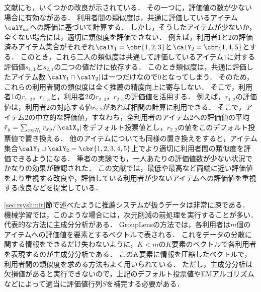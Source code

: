 文献\cite{uai:98:01}にも，いくつかの改良が示されている．
その一つに，評価値の数が少ない場合に有効ながある．
利用者間の類似度は，共通に評価しているアイテム$\calY_{ax}$への評価に基づいて計算する．
しかし，そうしたアイテムが少ないか，全くない場合には，適切に類似度を評価できない．
例えば，利用者1と2の評価済みアイテム集合がそれぞれ$\calY_1=\cbr{1,2,3}$と$\calY_2=\cbr{1,4,5}$とする．
このとき，これら二人の類似度は共通して評価しているアイテム$1$に対する評価値$s_{1,1}$と$s_{2,1}$の二つの値だけに依存する．
このとき類似度は，共通に評価したアイテム数$|\calY_1\cap \calY_2|$は一つだけなので$0$となってしまう．
そのため，これらの利用者間の類似度は全く推薦の精度向上に寄与しない．
そこで，利用者1の$r_{1,2}$，$r_{1,3}$と，利用者2の$r_{2,4}$，$r_{2,5}$の評価値を活用する．
例えば，$r_{1,2}$の評価値は，利用者2の対応する値$r_{2,2}$があれば相関の計算に利用できる．
そこで，アイテム2の中立的な評価値，すなわち，全利用者のアイテム2への評価値の平均$\tilde{r}_y=\sum_{x\in\cal{X}_y} r_{xy}/|\calX_y|$をデフォルト投票値とし，$r_{2,2}$の値をこのデフォルト投票値で置き換える．
他のアイテムについても同様の置き換えをすると，アイテム集合$\calY_1\cup\calY_2=\cbr{1,2,3,4,5}$上でより適切に利用者間の類似度を評価できるようになる．
筆者の実験でも，一人あたりの評価値数が少ない状況でかなりの効果が確認された．
この文献\cite{uai:98:01}では，最低や最高など両端に近い評価値をより重視する改良や，評価している利用者が少ないアイテムへの評価値を重視する改良などを提案している．

\ref{sec:rsyslimit}節で述べたように推薦システムが扱うデータは非常に疎である．
機械学習では，このような場合には，次元削減の前処理を実行することが多い．
代表的な方法に主成分分析\cite{eb:053:00,jpublist:077x,jb:021:00}がある．
GroupLensの方法では，各利用者は$m$個のアイテムへの評価値を要素とするベクトルで表される．
これをデータの分散に関する情報をできるだけ失わないように，$K< m$の$K$要素のベクトルで各利用者を表現するのが主成分分析である．
この$K$要素に情報を圧縮したベクトルで，利用者間の類似度を求める方法もよく用いられている\cite{ec:007,sigir:06:01}．
ただし，主成分分析は欠損値があると実行できないので，上記のデフォルト投票値やEMアルゴリズムなどによって適当に評価値行列$S$を補完する必要がある．

